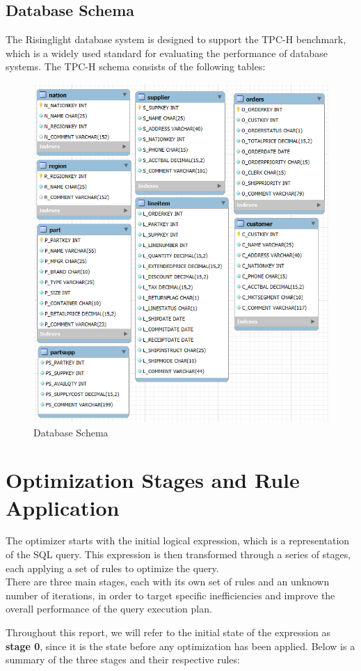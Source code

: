 \documentclass[a4paper,12pt]{scrreprt}
\begin{document}
\section{Database Schema}

The Risinglight database system is designed to support the TPC-H benchmark, which is a widely used standard for evaluating the performance of database systems. The TPC-H schema consists of the following tables:
\begin{figure}[H]
    \centering
    \includegraphics[width=0.75\linewidth]{img/image.png}
    \caption{Database Schema}
    \label{fig:database_schema}
\end{figure}


\chapter{Optimization Stages and Rule Application}

The optimizer starts with the initial logical expression, which is a representation of the SQL query. This expression is then transformed through a series of stages, each applying a set of rules to optimize the query. \\
There are three main stages, each with its own set of rules and an unknown number of iterations, in order to target specific inefficiencies and improve the overall performance of the query execution plan. 

Throughout this report, we will refer to the initial state of the expression as \textbf{stage 0}, since it is the state before any optimization has been applied.
Below is a summary of the three stages and their respective rules:
\end{document}
